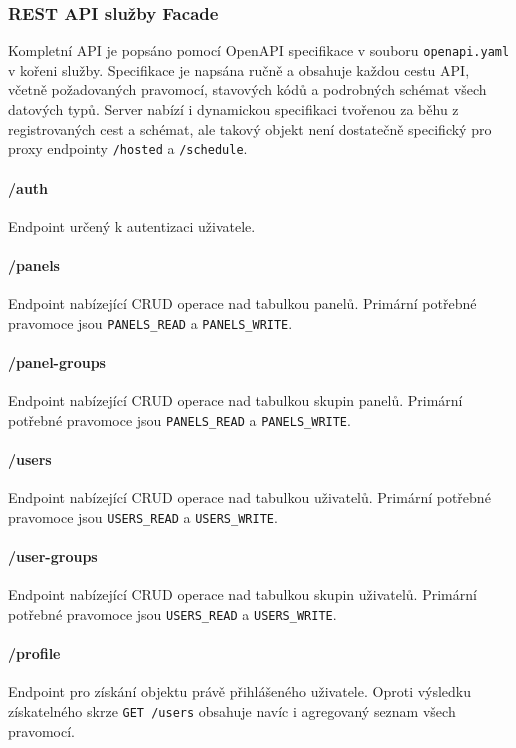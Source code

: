 \subsubsection{REST API služby Facade}
Kompletní API je popsáno pomocí OpenAPI specifikace v souboru \lstinline|openapi.yaml| v kořeni služby. Specifikace je napsána ručně a obsahuje každou cestu API, včetně požadovaných pravomocí, stavových kódů a podrobných schémat všech datových typů. Server nabízí i dynamickou specifikaci tvořenou za běhu z registrovaných cest a schémat, ale takový objekt není dostatečně specifický pro proxy endpointy \lstinline|/hosted| a \lstinline|/schedule|. 

\paragraph*{/auth}
Endpoint určený k autentizaci uživatele.

\paragraph*{/panels}
Endpoint nabízející CRUD operace nad tabulkou panelů. Primární potřebné pravomoce jsou \lstinline{PANELS_READ} a \lstinline{PANELS_WRITE}.

\paragraph*{/panel-groups}
Endpoint nabízející CRUD operace nad tabulkou skupin panelů. Primární potřebné pravomoce jsou \lstinline{PANELS_READ} a \lstinline{PANELS_WRITE}.

\paragraph*{/users}
Endpoint nabízející CRUD operace nad tabulkou uživatelů. Primární potřebné pravomoce jsou \lstinline{USERS_READ} a \lstinline{USERS_WRITE}.

\paragraph*{/user-groups}
Endpoint nabízející CRUD operace nad tabulkou skupin uživatelů. Primární potřebné pravomoce jsou \lstinline{USERS_READ} a \lstinline{USERS_WRITE}.

\paragraph*{/profile}
Endpoint pro získání objektu právě přihlášeného uživatele. Oproti výsledku získatelného skrze \lstinline|GET /users| obsahuje navíc i agregovaný seznam všech pravomocí.

